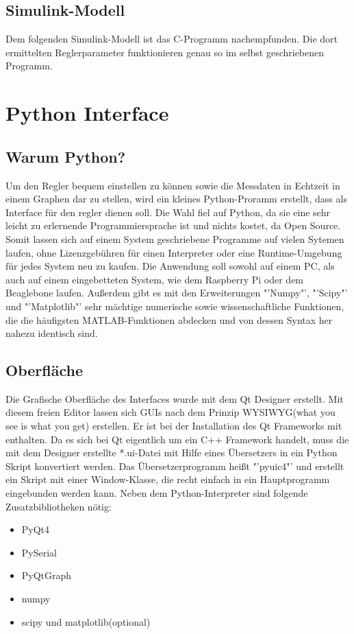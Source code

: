 \documentclass[a4paper]{report}
\begin{document}
\section{Simulink-Modell}
Dem folgenden Simulink-Modell ist das C-Programm nachempfunden. Die dort ermittelten Reglerparameter funktionieren genau so im selbst geschriebenen Programm.

\chapter{Python Interface}
\section{Warum Python?}
Um den Regler bequem einstellen zu k\"onnen sowie die Messdaten in Echtzeit in einem Graphen dar zu stellen, wird ein kleines Python-Proramm erstellt, dass als Interface für den regler dienen soll. Die Wahl fiel auf Python, da sie eine sehr leicht zu erlernende Programmiersprache ist und nichts kostet, da Open Source. Somit lassen sich auf einem System geschriebene Programme auf vielen Sytemen laufen, ohne Lizenzgebühren f\"ur einen Interpreter oder eine Runtime-Umgebung f\"ur jedes System neu zu kaufen. Die Anwendung soll sowohl auf einem PC, als auch auf einem eingebetteten System, wie dem Raspberry Pi oder dem Beaglebone laufen. Außerdem gibt es mit den Erweiterungen "'Numpy"', "'Scipy"' und "'Matplotlib"' sehr m\"achtige numerische sowie wissenschaftliche Funktionen, die die h\"aufigsten MATLAB-Funktionen abdecken und von dessen Syntax her nahezu identisch sind. 
\section{Oberfl\"ache}
Die Grafische Oberfl\"ache des Interfaces wurde mit dem Qt Designer erstellt. Mit diesem freien Editor lassen sich GUIs nach dem Prinzip WYSIWYG(what you see is what you get) erstellen. Er ist bei der Installation des Qt Frameworks mit enthalten. Da es sich bei Qt eigentlich um ein C++ Framework handelt, muss die mit dem Designer erstellte *.ui-Datei mit Hilfe eines \"Ubersetzers in ein Python Skript konvertiert werden. Das \"Ubersetzerprogramm heißt "'pyuic4"' und erstellt ein Skript mit einer Window-Klasse, die recht einfach in ein Hauptprogramm eingebunden werden kann. Neben dem Python-Interpreter sind folgende Zusatzbibliotheken n\"otig:
\begin{itemize}
\item PyQt4
\item PySerial
\item PyQtGraph
\item numpy
\item scipy und matplotlib(optional)

\end{itemize}
\end{document}
